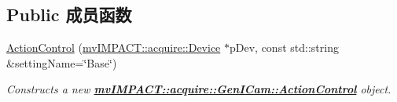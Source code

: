 \subsection*{Public 成员函数}
\begin{DoxyCompactItemize}
\item 
\hyperlink{classmv_i_m_p_a_c_t_1_1acquire_1_1_gen_i_cam_1_1_action_control_a56eca802da75b6c50fdb665ab02716a9}{Action\+Control} (\hyperlink{classmv_i_m_p_a_c_t_1_1acquire_1_1_device}{mv\+I\+M\+P\+A\+C\+T\+::acquire\+::\+Device} $\ast$p\+Dev, const std\+::string \&setting\+Name=\char`\"{}Base\char`\"{})
\begin{DoxyCompactList}\small\item\em Constructs a new {\bfseries \hyperlink{classmv_i_m_p_a_c_t_1_1acquire_1_1_gen_i_cam_1_1_action_control}{mv\+I\+M\+P\+A\+C\+T\+::acquire\+::\+Gen\+I\+Cam\+::\+Action\+Control}} object. \end{DoxyCompactList}\end{DoxyCompactItemize}
